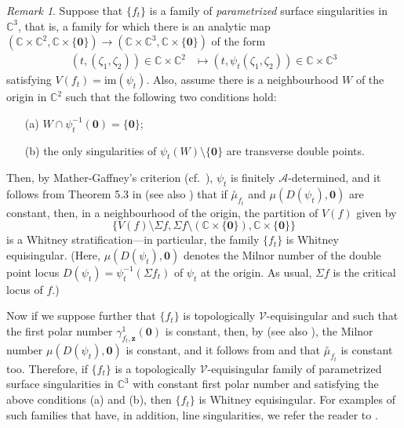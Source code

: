\documentclass[a4paper,fleqn,11pt]{amsart}
\theoremstyle{definition}
\theoremstyle{remark}
\newtheorem{remark}[theorem]{Remark}
\numberwithin{equation}{section}
\begin{document}
\begin{remark}	
Suppose that $\{f_t\}$ is a family of \emph{parametrized} surface singularities in $\mathbb{C}^3$, that is, a family for which there is an analytic map $(\mathbb{C}\times\mathbb{C}^2,\mathbb{C}\times\{\mathbf{0}\})  \to
(\mathbb{C}\times\mathbb{C}^3,\mathbb{C}\times\{\mathbf{0}\})$
of the form
\begin{align*}
(t,(\zeta_1,\zeta_2))\in \mathbb{C}\times\mathbb{C}^2 & \mapsto (t,\psi_t(\zeta_1,\zeta_2))\in \mathbb{C}\times\mathbb{C}^3
\end{align*}
satisfying $V(f_t)=\mbox{im}(\psi_t)$. Also, assume there is a neighbourhood $W$ of the origin in $\mathbb{C}^2$ such that the following two conditions hold:
\begin{enumerate}
\item[(a)]
$W\cap \psi_t^{-1}(\mathbf{0})=\{\mathbf{0}\}$;
\item[(b)]
the only singularities of $\psi_t(W)\setminus\{\mathbf{0}\}$ are transverse double points.
\end{enumerate}
Then, by Mather-Gaffney's criterion (cf.~\cite{Wall}), $\psi_t$ is finitely $\mathscr{A}$-determined, and it follows from Theorem 5.3 in \cite{MNP} (see also \cite{Gaffney}) that if $\overset{\circ}{\mu}_{f_t}$ and $\mu(D(\psi_t),\mathbf{0})$ are constant, then, in a neighbourhood of the origin, the partition of $V(f)$ given by
\begin{equation*}
\{V(f)\setminus \Sigma f,\Sigma f\setminus (\mathbb{C}\times \{\mathbf{0}\}), \mathbb{C}\times \{\mathbf{0}\}\}
\end{equation*}
is a Whitney stratification---in particular, the family $\{f_t\}$ is Whitney equisingular. (Here, $\mu(D(\psi_t),\mathbf{0})$ denotes the Milnor number of the double point locus $D(\psi_t)=\psi_t^{-1}(\Sigma f_t)$ of $\psi_t$ at the origin. As usual, $\Sigma f$ is the critical locus of $f$.)

Now if we suppose further that $\{f_t\}$ is topologically $\mathscr{V}$-equi\-singular and such that the first polar number $\gamma^1_{f_t,\mathbf{z}}(\mathbf{0})$ is constant, then, by \cite[Theorem 6.2]{CB-H-R} (see also \cite{BP}), the Milnor number $\mu(D(\psi_t),\mathbf{0})$ is constant, and it follows from \cite[Proposition 3.3]{R}  and \cite[Lemma 5.2]{MNP} that $\overset{\circ}{\mu}_{f_t}$ is constant too. 
Therefore, if $\{f_t\}$ is a topologically $\mathscr{V}$-equi\-singular family of parametrized surface singularities in $\mathbb{C}^3$ with constant first polar number and satisfying the above conditions (a) and (b), then $\{f_t\}$ is Whitney equisingular. For examples of such families that have, in addition, line singularities, we refer the reader to \cite{Mond}.
\end{remark}
\end{document}
